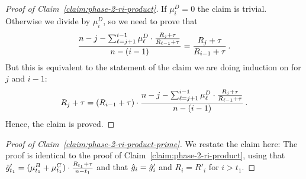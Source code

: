 \begin{proof}[Proof of Claim~\ref{claim:phase-2-ri-product}]
    If $\mu_i^D = 0$ the claim is trivial. Otherwise we divide by $\mu_i^D$, so we need to prove that
    \begin{equation*}\frac{ n - j - \sum_{\ell = j + 1}^{i-1} \mu_{\ell}^D \cdot \frac{R_j + \tau}{R_{\ell - 1} + \tau}}{n - (i - 1)} = \frac{R_{j}+\tau}{R_{i-1}+\tau}\,.\end{equation*}
    But this is equivalent to the statement of the claim we are doing induction on for $j$ and $i-1$:
    \begin{equation*}R_{j}+\tau = \left(R_{i-1}+\tau\right) \cdot \frac{n - j - \sum_{\ell=j+1}^{i-1} \mu_\ell^D \cdot \frac{R_j+\tau}{R_{\ell-1}+\tau}}{n - (i - 1)}\,.\end{equation*}
    Hence, the claim is proved.
\end{proof}

\begin{proof}[Proof of Claim~\ref{claim:phase-2-ri-product-prime}]
    We restate the claim here:
    \claimphasetworiproductprime*
    The proof is identical to the proof of Claim~\ref{claim:phase-2-ri-product}, using that $\hat{g}'_{t_1} = (\mu_{t_1}^B + \mu_{t_1}^C) \cdot \frac{R_{t_1}+\tau}{n-t_1}$ and that $\hat{g}_i = \hat{g}'_i$ and $R_i = R'_i$ for $i > t_1$.
\end{proof}
